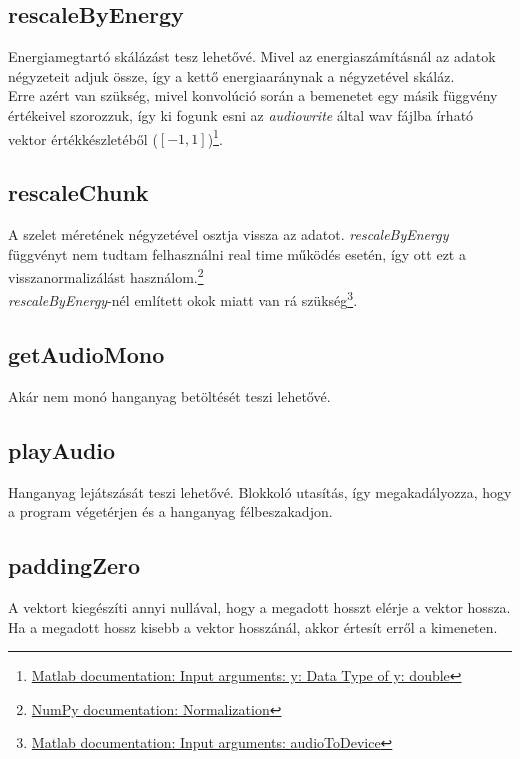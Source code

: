 \documentclass{article}
\begin{document}
	\subsection*{rescaleByEnergy}
		Energiamegtartó skálázást tesz lehetővé. Mivel az energiaszámításnál az adatok négyzeteit adjuk össze, így a kettő energiaaránynak a négyzetével skáláz. \\
		Erre azért van szükség, mivel konvolúció során a bemenetet egy másik függvény értékeivel szorozzuk, így ki fogunk esni az \textit{audiowrite} által wav fájlba írható vektor értékkészletéből ($[-1, 1]$)\footnote{\href{https://www.mathworks.com/help/matlab/ref/audiowrite.html\#expand_panel_heading_btiacgz-1-y}{Matlab documentation: Input arguments: y: Data Type of y: double}}.
		
	\subsection*{rescaleChunk}
		A szelet méretének négyzetével osztja vissza az adatot. \textit{rescaleByEnergy} függvényt nem tudtam felhasználni real time működés esetén, így ott ezt a visszanormalizálást használom.\footnote{\href{https://numpy.org/doc/stable/reference/routines.fft.html\#normalization}{NumPy documentation: Normalization}} \\
		\textit{rescaleByEnergy}-nél említett okok miatt van rá szükség\footnote{\href{https://www.mathworks.com/help/audio/ref/audiodevicewriter-system-object.html\#expand_panel_heading_mw_de214585-205f-44e4-b3aa-88b50a0ae85a}{Matlab documentation: Input arguments: audioToDevice}}.
		
	\subsection*{getAudioMono}
		Akár nem monó hanganyag betöltését teszi lehetővé.
		
	\subsection*{playAudio}
		Hanganyag lejátszását teszi lehetővé. Blokkoló utasítás, így megakadályozza, hogy a program végetérjen és a hanganyag félbeszakadjon.
		
	\subsection*{paddingZero}
		A vektort kiegészíti annyi nullával, hogy a megadott hosszt elérje a vektor hossza. Ha a megadott hossz kisebb a vektor hosszánál, akkor értesít erről a kimeneten.
		
\end{document}
